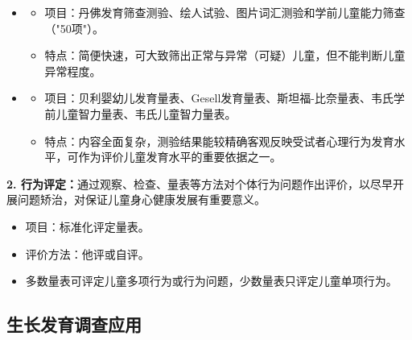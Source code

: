 \begin{defbox}
\begin{itemize}[leftmargin=*]
    \item {}
    \begin{itemize}
        \item 项目：丹佛发育筛查测验、绘人试验、图片词汇测验和学前儿童能力筛查（"50项"）。
        \item 特点：简便快速，可大致筛出正常与异常（可疑）儿童，但不能判断儿童异常程度。
    \end{itemize}
    \item {}
    \begin{itemize}
        \item 项目：贝利婴幼儿发育量表、Gesell发育量表、斯坦福-比奈量表、韦氏学前儿童智力量表、韦氏儿童智力量表。
        \item 特点：内容全面复杂，测验结果能较精确客观反映受试者心理行为发育水平，可作为评价儿童发育水平的重要依据之一。
    \end{itemize}
\end{itemize}

\textbf{2. 行为评定：}通过观察、检查、量表等方法对个体行为问题作出评价，以尽早开展问题矫治，对保证儿童身心健康发展有重要意义。

\begin{itemize}[leftmargin=*]
    \item 项目：标准化评定量表。
    \item 评价方法：他评或自评。
    \item 多数量表可评定儿童多项行为或行为问题，少数量表只评定儿童单项行为。
\end{itemize}
\end{defbox}

\subsection{生长发育调查应用}

